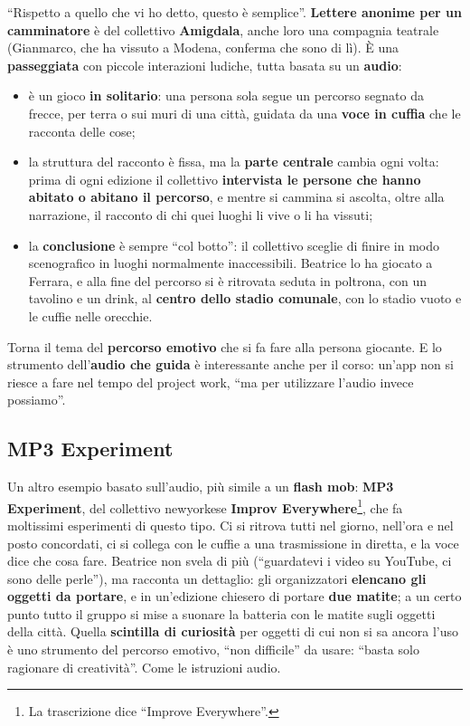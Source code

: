 ``Rispetto a quello che vi ho detto, questo è semplice''. \textbf{Lettere
anonime per un camminatore} è del collettivo \textbf{Amigdala}, anche loro una
compagnia teatrale (Gianmarco, che ha vissuto a Modena, conferma che sono di
lì). È una \textbf{passeggiata} con piccole interazioni ludiche, tutta basata su
un \textbf{audio}:
\begin{itemize}
  \item è un gioco \textbf{in solitario}: una persona sola segue un percorso
        segnato da frecce, per terra o sui muri di una città, guidata da una
        \textbf{voce in cuffia} che le racconta delle cose;
  \item la struttura del racconto è fissa, ma la \textbf{parte centrale} cambia
        ogni volta: prima di ogni edizione il collettivo \textbf{intervista le
        persone che hanno abitato o abitano il percorso}, e mentre si cammina si
        ascolta, oltre alla narrazione, il racconto di chi quei luoghi li vive o
        li ha vissuti;
  \item la \textbf{conclusione} è sempre ``col botto'': il collettivo sceglie di
        finire in modo scenografico in luoghi normalmente inaccessibili.
        Beatrice lo ha giocato a Ferrara, e alla fine del percorso si è
        ritrovata seduta in poltrona, con un tavolino e un drink, al
        \textbf{centro dello stadio comunale}, con lo stadio vuoto e le cuffie
        nelle orecchie.
\end{itemize}
Torna il tema del \textbf{percorso emotivo} che si fa fare alla persona giocante.
E lo strumento dell'\textbf{audio che guida} è interessante anche per il corso:
un'app non si riesce a fare nel tempo del project work, ``ma per utilizzare
l'audio invece possiamo''.

\subsection{MP3 Experiment}

Un altro esempio basato sull'audio, più simile a un \textbf{flash mob}:
\textbf{MP3 Experiment}, del collettivo newyorkese \textbf{Improv
Everywhere}\footnote{La trascrizione dice ``Improve Everywhere''.}, che fa
moltissimi esperimenti di questo tipo. Ci si ritrova tutti nel giorno, nell'ora
e nel posto concordati, ci si collega con le cuffie a una trasmissione in
diretta, e la voce dice che cosa fare. Beatrice non svela di più (``guardatevi i
video su YouTube, ci sono delle perle''), ma racconta un dettaglio: gli
organizzatori \textbf{elencano gli oggetti da portare}, e in un'edizione chiesero
di portare \textbf{due matite}; a un certo punto tutto il gruppo si mise a
suonare la batteria con le matite sugli oggetti della città. Quella
\textbf{scintilla di curiosità} per oggetti di cui non si sa ancora l'uso è uno
strumento del percorso emotivo, ``non difficile'' da usare: ``basta solo
ragionare di creatività''. Come le istruzioni audio.

